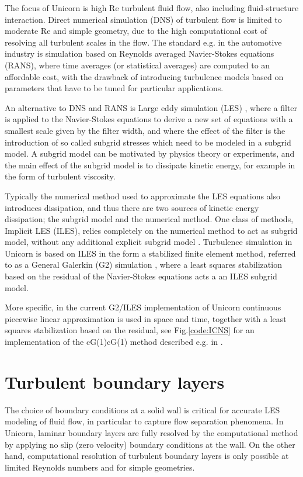 The focus of Unicorn is high Re turbulent fluid flow, also including fluid-structure interaction. Direct numerical simulation (DNS) of turbulent flow is limited to moderate Re and simple geometry, due to the high computational cost of resolving all turbulent scales in the flow. The standard e.g. in the automotive industry is simulation based on Reynolds averaged Navier-Stokes equations (RANS), where time averages (or statistical averages) are computed to an affordable cost, with the drawback of introducing turbulence models based on parameters that have to be tuned for particular applications.   

An alternative to DNS and RANS is Large eddy simulation (LES) \cite{Sagaut2005}, where a filter is applied to the Navier-Stokes equations to derive a new set of equations with a smallest scale given by the filter width, and where the effect of the filter is the introduction of so called subgrid stresses which need to be modeled in a subgrid model. A subgrid model can be motivated by physics theory or experiments, and the main effect of the subgrid model is to dissipate kinetic energy, for example in the form of turbulent viscosity. 

Typically the numerical method used to approximate the LES equations also introduces dissipation, and thus there are two sources of kinetic energy dissipation; the subgrid model and the numerical method. One class of methods, Implicit LES (ILES), relies completely on the numerical method to act as subgrid model, without any additional explicit subgrid model \cite{Sagaut2005}. Turbulence simulation in Unicorn is based on ILES in the form a stabilized finite element method, referred to as a General Galerkin (G2) simulation \cite{HoffmanJohnson2007}, where a least squares stabilization based on the residual of the Navier-Stokes equations acts a an ILES subgrid model.  

More specific, in the current G2/ILES implementation of Unicorn continuous piecewise linear approximation is used in space and time, together with a least squares stabilization based on the residual, see Fig.\ref{code:ICNS} for an implementation of the cG(1)cG(1) method described e.g. in \cite{HoffmanJohnson2007}. 

\section{Turbulent boundary layers}
\label{section:blayer}

The choice of boundary conditions at a solid wall is critical for accurate LES modeling of fluid flow, in particular to capture flow separation phenomena. In Unicorn, laminar boundary layers are fully resolved by the computational method by applying no slip (zero velocity) boundary conditions at the wall. On the other hand, computational resolution of turbulent boundary layers is only possible at limited Reynolds numbers and for simple geometries. 

